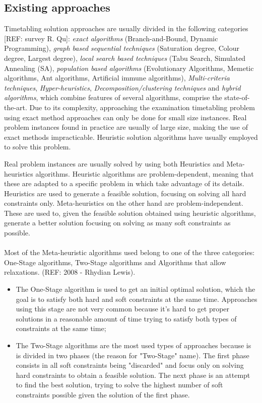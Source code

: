 \subsection{Existing approaches}
\label{subsection:ExistingAppr}
Timetabling solution approaches are usually divided in the following categories [REF: survey R. Qu]: \textit{exact algorithms} (Branch-and-Bound, Dynamic Programming), \textit{graph based sequential techniques} (Saturation degree, Colour degree, Largest degree), \textit{local search based techniques} (Tabu Search, Simulated Annealing (SA), \textit{population based algorithms} (Evolutionary Algorithms, Memetic algorithms, Ant algorithms, Artificial immune algorithms), \textit{Multi-criteria techniques}, \textit{Hyper-heuristics}, \textit{Decomposition/clustering techniques} and \textit{hybrid algorithms}, which combine features of several algorithms, comprise the state-of-the-art. Due to its complexity, approaching the examination timetabling problem using exact method approaches can only be done for small size instances. Real problem instances found in practice are usually of large size, making the use of exact methods impracticable. Heuristic solution algorithms have usually employed to solve this problem.

Real problem instances are usually solved by using both Heuristics and Meta-heuristics algorithms. Heuristic algorithms are problem-dependent, meaning that these are adapted to a specific problem in which take advantage of its details. Heuristics are used to generate a feasible solution, focusing on solving all hard constraints only. Meta-heuristics on the other hand are problem-independent. These are used to, given the feasible solution obtained using heuristic algorithms, generate a better solution focusing on solving as many soft constraints as possible.\\
\\
Most of the Meta-heuristic algorithms used belong to one of the three categories: One-Stage algorithms, Two-Stage algorithms and Algorithms that allow relaxations. (REF: 2008 - Rhydian Lewis). 
\begin{itemize}
  \item The One-Stage algorithm is used to get an initial optimal solution, which the goal is to satisfy both hard and soft constraints at the same time. Approaches using this stage are not very common because it's hard to get proper solutions in a reasonable amount of time trying to satisfy both types of constraints at the same time;
  \item The Two-Stage algorithms are the most used types of approaches because is is divided in two phases (the reason for "Two-Stage" name). The first phase consists in all soft constraints being "discarded" and focus only on solving hard constraints to obtain a feasible solution. The next phase is an attempt to find the best solution, trying to solve the highest number of soft constraints possible given the solution of the first phase.
\end{itemize}

